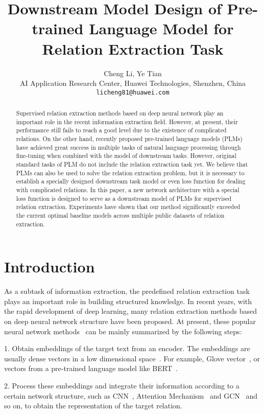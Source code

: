 \documentclass[11pt,a4paper]{article}
\title{Downstream Model Design of Pre-trained Language Model for Relation Extraction Task}
\author{Cheng Li, Ye Tian \\
 AI Application Research Center, 
 Huawei Technologies,
  Shenzhen, China \\
  \texttt{licheng81@huawei.com} }
\date{}
\begin{document}
\maketitle
\begin{abstract}
Supervised relation extraction methods based on deep neural network play an important role in the recent information extraction field. However, at present, their performance still fails to reach a good level due to the existence of complicated relations. On the other hand, recently proposed pre-trained language models (PLMs) have achieved great success in multiple tasks of natural language processing through fine-tuning when combined with the model of downstream tasks. However, original standard tasks of PLM do not include the relation extraction task yet. We believe that PLMs can also be used to solve the relation extraction problem, but it is necessary to establish a specially designed downstream task model or even loss function for dealing with complicated relations. In this paper, a new network architecture with a special loss function is designed to serve as a downstream model of PLMs for supervised relation extraction. Experiments have shown that our method significantly exceeded the current optimal baseline models across multiple public datasets of relation extraction.
\end{abstract}



\section{Introduction}
As a subtask of information extraction, the predefined relation extraction task plays an important role in building structured knowledge. In recent years, with the rapid development of deep learning, many relation extraction methods based on deep neural network structure have been proposed. At present, these popular neural network methods~\cite{liu2013convolution,zeng2014relation,nguyen2015relation,lin2016neural,jiang2016relation,han2018hierarchical,fu2019graphrel,soares2019matching} can be mainly summarized by the following steps:

1. Obtain embeddings of the target text from an encoder. The embeddings are usually dense vectors in a low dimensional space~\cite{mikolov2013distributed}. For example, Glove vector~\cite{pennington2014glove}, or vectors from a pre-trained language model like BERT~\cite{devlin2018bert}.

2. Process these embeddings and integrate their information according to a certain network structure, such as CNN~\cite{nguyen2015relation}, Attention Mechanism~\cite{lin2016neural,han2018hierarchical} and GCN~\cite{fu2019graphrel} and so on, to obtain the representation of the target relation.
\end{document}
